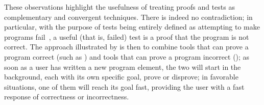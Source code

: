 These observations highlight the usefulness of treating proofs and tests as complementary and convergent techniques.
There is indeed no contradiction; in particular, with the purpose of tests being entirely defined as attempting to make programs fail~\cite{MEYER08}, a useful (that is, failed) test is a proof that the program is not correct. The approach illustrated by \EVE is then to combine tools that can prove a program correct (such as \AutoProof) and tools that can prove a program incorrect (\AutoTest); as soon as a user has written a new program element, the two will start in the background, each with its own specific goal, prove or disprove; in favorable situations, one of them will reach its goal fast, providing the user with a fast response of correctness or incorrectness.

